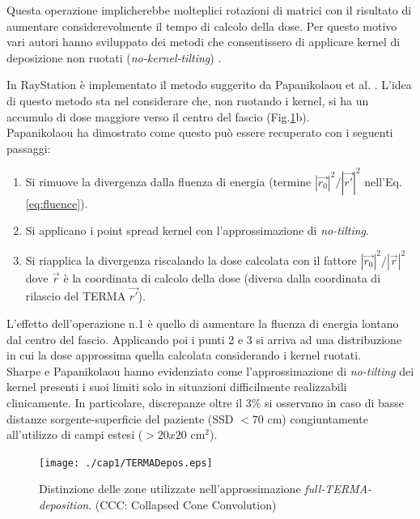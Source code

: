 {\begin{figure}
\label{fig:kern_tilt}
\end{figure}
Questa operazione implicherebbe molteplici rotazioni di matrici \cite{Sharpe1997} con il risultato di aumentare considerevolmente il tempo di calcolo della dose. 
Per questo motivo vari autori hanno sviluppato dei metodi che consentissero di applicare kernel di deposizione non ruotati (\textit{no-kernel-tilting}) \cite{Sharpe1997,Papanikolaou1993}.

In RayStation è implementato il metodo suggerito da Papanikolaou et al. \cite{Papanikolaou1993}. L'idea di questo metodo sta nel considerare che, non ruotando i kernel, si ha un accumulo di dose maggiore verso il centro del fascio (Fig.\ref{fig:kern_tilt}b).\\ 
Papanikolaou ha dimostrato come questo può essere recuperato con i seguenti passaggi:
\begin{enumerate}
\item Si rimuove la divergenza dalla fluenza di energia (termine $|\vec{r_0}|^2/|\vec{r'}|^2$ nell'Eq.\eqref{eq:fluence}).
\item Si applicano i point spread kernel con l'approssimazione di \textit{no-tilting}.
\item Si riapplica la divergenza riscalando la dose calcolata con il fattore $|\vec{r_0}|^2/|\vec{r}|^2$ dove $\vec{r}$ è la coordinata di calcolo della dose (diversa dalla coordinata di rilascio del TERMA $\vec{r'}$).
\end{enumerate}
L'effetto dell'operazione n.1 è quello di aumentare la fluenza di energia lontano dal centro del fascio. Applicando poi i punti 2 e 3 si arriva ad una distribuzione in cui la dose approssima quella calcolata considerando i kernel ruotati.\\
Sharpe e Papanikolaou \cite{Sharpe1997,Papanikolaou1993} hanno evidenziato come l'approssimazione di \textit{no-tilting} dei kernel presenti i suoi limiti solo in situazioni difficilmente realizzabili clinicamente. In particolare, discrepanze oltre il 3\% si osservano in caso di basse distanze sorgente-superficie del paziente (SSD $< 70$ cm) congiuntamente all'utilizzo di campi estesi ($> 20x20$ cm$^2$).

\begin{figure}
\centering
\texttt{[image: ./cap1/TERMADepos.eps]}
\caption{Distinzione delle zone utilizzate nell'approssimazione \textit{full-TERMA-deposition}. (CCC: Collapsed Cone Convolution)}
\label{fig:TERMADepos}
\end{figure}

}
